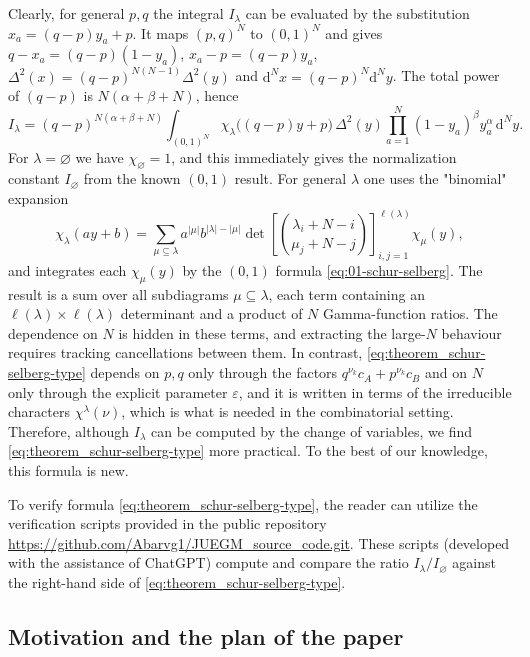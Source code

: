 \documentclass{article}
\newcommand{\dif}{\mathrm{d}}
\theoremstyle{plain}
\theoremstyle{definition}
\numberwithin{equation}{section}
\begin{document}
Clearly, for general $p,q$ the integral $I_\lambda$ can be evaluated by the
substitution $x_a=(q-p)y_a+p$. It maps $(p,q)^N$ to $(0,1)^N$ and gives
$q-x_a=(q-p)(1-y_a)$, $x_a-p=(q-p)y_a$,
$\Delta^2(x)=(q-p)^{N(N-1)}\Delta^2(y)$ and $\dif^N x=(q-p)^N\dif^N y$.
The total power of $(q-p)$ is $N(\alpha+\beta+N)$, hence
\begin{equation}
    I_\lambda=(q-p)^{N(\alpha+\beta+N)}\int_{(0,1)^N}\chi_\lambda\big((q-p)y+p\big)\,
\Delta^2(y)\prod_{a=1}^N(1-y_a)^\beta y_a^\alpha\,\dif^N y .
\end{equation}
For $\lambda=\varnothing$ we have $\chi_\varnothing=1$, and this immediately
gives the normalization constant $I_\varnothing$ from the known $(0,1)$ result.
For general $\lambda$ one uses the "binomial" expansion~\cite[I, §3, Example 10]{macdonald1995symmetric}
\begin{equation}
    \chi_\lambda(ay+b)=\sum_{\mu\subseteq\lambda}a^{|\mu|}b^{|\lambda|-|\mu|}   \det\!\left[\binom{\lambda_i+N-i}{\mu_j+N-j}\right]_{i,j=1}^{\ell(\lambda)}\chi_\mu(y),
\end{equation}
and integrates each $\chi_\mu(y)$ by the $(0,1)$ formula \eqref{eq:01-schur-selberg}. The result is a sum over
all subdiagrams $\mu\subseteq\lambda$, each term containing an $\ell(\lambda)\times \ell(\lambda)$ determinant and a product of $N$ Gamma-function ratios. The dependence on $N$
is hidden in these terms, and extracting the large-$N$ behaviour requires
tracking cancellations between them. In contrast,
\eqref{eq:theorem_schur-selberg-type} depends on $p,q$ only through the
factors $q^{\nu_k}c_A+p^{\nu_k}c_B$ and on $N$ only through the explicit
parameter $\varepsilon$, and it is written in terms of the irreducible
characters $\chi^\lambda(\nu)$, which is what is needed in the combinatorial
setting. Therefore, although $I_\lambda$ can be computed by the change of
variables, we find \eqref{eq:theorem_schur-selberg-type} more practical.
To the best of our knowledge, this formula is new.

To verify formula \eqref{eq:theorem_schur-selberg-type}, the reader can utilize the verification scripts provided in the public repository \url{https://github.com/Abarvg1/JUEGM_source_code.git}. These scripts (developed with the assistance of ChatGPT) compute and compare the ratio $I_\lambda/I_\varnothing$ against the right-hand side of \eqref{eq:theorem_schur-selberg-type}.

\subsection{Motivation and the plan of the paper}
\end{document}
